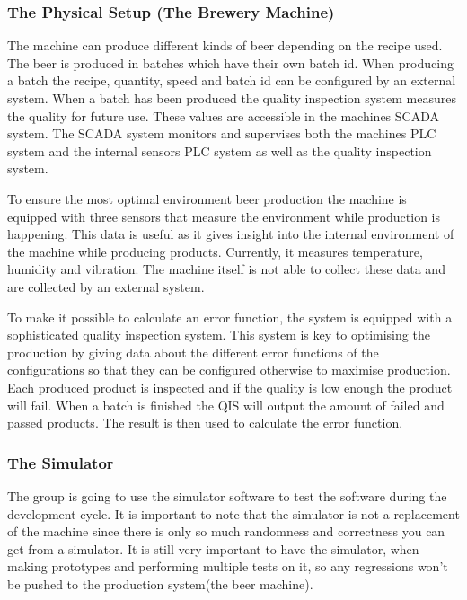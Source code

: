 \subsubsection{The Physical Setup (The Brewery Machine)}

The machine can produce different kinds of beer depending on the recipe
used. The beer is produced in batches which have their own batch id. When 
producing a batch the recipe, quantity, speed and batch id can be configured by 
an external system. When a batch has been produced the quality inspection system 
measures the quality for future use. These values are accessible in the machines 
SCADA system. The SCADA system monitors and supervises both the machines PLC 
system and the internal sensors PLC system as well as the quality inspection 
system.

To ensure the most optimal environment beer production the 
machine is equipped with three sensors that measure the environment while 
production is happening. This data is useful as it gives insight into the 
internal environment of the machine while producing products. Currently, it 
measures temperature, humidity and vibration. The machine itself is not able to 
collect these data and are collected by an external system.

To make it possible to calculate an error function, the system is 
equipped with a sophisticated quality inspection system. This system is key to 
optimising the production by giving data about the different error functions of 
the configurations so that they can be configured otherwise to maximise 
production. Each produced product is inspected and if the quality is low enough
the product will fail. When a batch is finished the QIS will output the amount 
of failed and passed products. The result is then used to calculate the error
function.


\subsubsection{The Simulator}
The group is going to use the simulator software to test the software during the
development cycle.
It is important to note that the simulator is not a replacement of the machine
since there is only so much randomness and correctness you can get from a 
simulator. 
It is still very important to have the simulator, when making prototypes and 
performing multiple tests on it, so any regressions won't be pushed to 
the production system(the beer machine).

